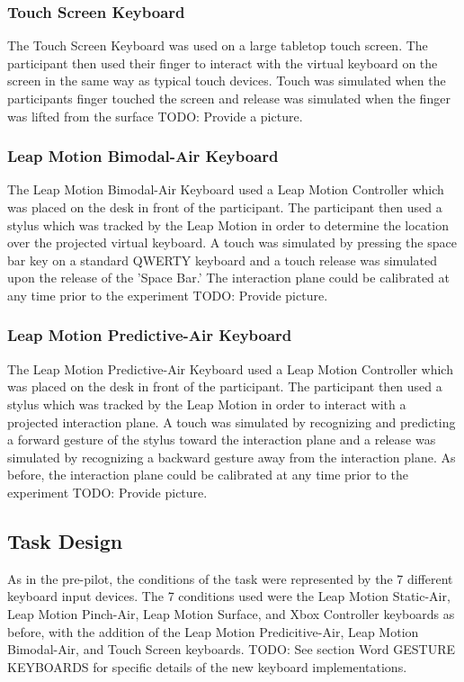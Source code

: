 \subsubsection{Touch Screen Keyboard}

The Touch Screen Keyboard was used on a large tabletop touch screen. The participant then used their finger to interact with the virtual keyboard on the screen in the same way as typical touch devices. Touch was simulated when the participants finger touched the screen and release was simulated when the finger was lifted from the surface TODO: Provide a picture.

\subsubsection{Leap Motion Bimodal-Air Keyboard}

The Leap Motion Bimodal-Air Keyboard used a Leap Motion Controller which was placed on the desk in front of the participant. The participant then used a stylus which was tracked by the Leap Motion in order to determine the location over the projected virtual keyboard. A touch was simulated by pressing the space bar key on a standard QWERTY keyboard and a touch release was simulated upon the release of the 'Space Bar.' The interaction plane could be calibrated at any time prior to the experiment TODO: Provide picture.

\subsubsection{Leap Motion Predictive-Air Keyboard}

The Leap Motion Predictive-Air Keyboard used a Leap Motion Controller which was placed on the desk in front of the participant. The participant then used a stylus which was tracked by the Leap Motion in order to interact with a projected interaction plane. A touch was simulated by recognizing and predicting a forward gesture of the stylus toward the interaction plane and a release was simulated by recognizing a backward gesture away from the interaction plane. As before, the interaction plane could be calibrated at any time prior to the experiment TODO: Provide picture.

\subsection{Task Design}

As in the pre-pilot, the conditions of the task were represented by the 7 different keyboard input devices. The 7 conditions used were the Leap Motion Static-Air, Leap Motion Pinch-Air, Leap Motion Surface, and Xbox Controller keyboards as before, with the addition of the Leap Motion Predicitive-Air, Leap Motion Bimodal-Air, and Touch Screen keyboards. TODO: See section Word GESTURE KEYBOARDS for specific details of the new keyboard implementations. 

